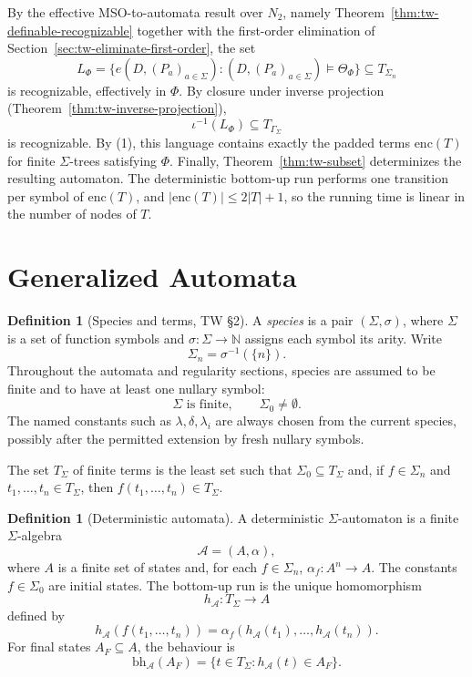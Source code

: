 \documentclass[11pt]{article}
\theoremstyle{definition}
\newtheorem{definition}[theorem]{Definition}
\newcommand{\Nat}{\mathbb N}
\newcommand{\SigmaSym}{\Sigma}
\newcommand{\rank}{\sigma}
\newcommand{\Term}[1]{T_{#1}}
\newcommand{\Aut}{\mathcal A}
\newcommand{\bh}{\mathrm{bh}}
\newcommand{\enc}{\mathrm{enc}}
\begin{document}
By the effective MSO-to-automata result over \(N_2\), namely
Theorem~\ref{thm:tw-definable-recognizable} together with the first-order
elimination of Section~\ref{sec:tw-eliminate-first-order}, the set
\[
  L_\Phi=
  \{e(D,(P_a)_{a\in\Sigma}):
      (D,(P_a)_{a\in\Sigma})\models\Theta_\Phi\}
  \subseteq\Term{\Sigma_n}
\]
is recognizable, effectively in \(\Phi\).  By closure under inverse projection
(Theorem~\ref{thm:tw-inverse-projection}),
\[
  \iota^{-1}(L_\Phi)\subseteq\Term{\Gamma_\Sigma}
\]
is recognizable.  By (1), this language contains exactly the padded terms
\(\enc(T)\) for finite \(\Sigma\)-trees satisfying \(\Phi\).  Finally,
Theorem~\ref{thm:tw-subset} determinizes the resulting automaton.  The
deterministic bottom-up run performs one transition per symbol of \(\enc(T)\),
and \(|\enc(T)|\le 2|T|+1\), so the running time is linear in the number of
nodes of \(T\).

\section{Generalized Automata}

\begin{definition}[Species and terms, TW \S2]
A \emph{species} is a pair \((\SigmaSym,\rank)\), where \(\SigmaSym\) is a set of
function symbols and \(\rank:\SigmaSym\to\Nat\) assigns each symbol its arity.
Write
\[
  \SigmaSym_n=\rank^{-1}(\{n\}).
\]
Throughout the automata and regularity sections, species are assumed to be
finite and to have at least one nullary symbol:
\[
  \SigmaSym \text{ is finite},\qquad \SigmaSym_0\ne\emptyset.
\]
The named constants such as \(\lambda,\delta,\lambda_i\) are always chosen from
the current species, possibly after the permitted extension by fresh nullary
symbols.

The set \(\Term{\SigmaSym}\) of finite terms is the least set such that
\(\SigmaSym_0\subseteq\Term{\SigmaSym}\) and, if \(f\in\SigmaSym_n\) and
\(t_1,\ldots,t_n\in\Term{\SigmaSym}\), then \(f(t_1,\ldots,t_n)\in
\Term{\SigmaSym}\).
\end{definition}

\begin{definition}[Deterministic automata]
A deterministic \(\SigmaSym\)-automaton is a finite
\(\SigmaSym\)-algebra
\[
  \Aut=(A,\alpha),
\]
where \(A\) is a finite set of states and, for each \(f\in\SigmaSym_n\),
\(\alpha_f:A^n\to A\).  The constants \(f\in\SigmaSym_0\) are initial states.
The bottom-up run is the unique homomorphism
\[
  h_\Aut:\Term{\SigmaSym}\to A
\]
defined by
\[
  h_\Aut(f(t_1,\ldots,t_n))
  =\alpha_f(h_\Aut(t_1),\ldots,h_\Aut(t_n)).
\]
For final states \(A_F\subseteq A\), the behaviour is
\[
  \bh_\Aut(A_F)=\{t\in\Term{\SigmaSym}:h_\Aut(t)\in A_F\}.
\]
\end{definition}
\end{document}
